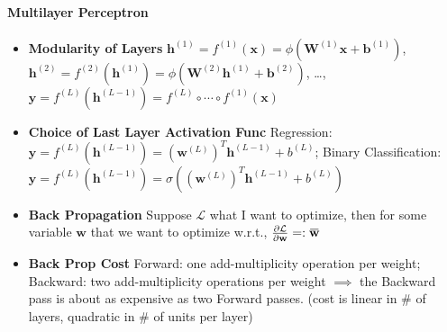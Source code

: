 \documentclass[10pt]{article}
\newcommand{\overbar}[1]{\mkern 1.5mu\overline{\mkern-1.5mu#1\mkern-1.5mu}\mkern 1.5mu}
\newcommand{\bw}{\mathbf{w}}
\begin{document}
\paragraph{Multilayer Perceptron} 
\begin{itemize}
    \setlength\itemsep{-0.45em}
    \item \textbf{Modularity of Layers} $\mathbf{h}^{(1)}=f^{(1)}(\mathbf{x})=\phi\left(\mathbf{W}^{(1)} \mathbf{x}+\mathbf{b}^{(1)}\right)$, $\mathbf{h}^{(2)}=f^{(2)}\left(\mathbf{h}^{(1)}\right)=\phi\left(\mathbf{W}^{(2)} \mathbf{h}^{(1)}+\mathbf{b}^{(2)}\right)$, \dots, $\mathbf{y}=f^{(L)}\left(\mathbf{h}^{(L-1)}\right) = f^{(L)} \circ \cdots \circ f^{(1)}(\mathbf{x})$
    \item \textbf{Choice of Last Layer Activation Func} Regression: $\mathbf{y}=f^{(L)}\left(\mathbf{h}^{(L-1)}\right)=\left(\mathbf{w}^{(L)}\right)^{T} \mathbf{h}^{(L-1)}+b^{(L)}$; Binary Classification: $\mathbf{y}=f^{(L)}\left(\mathbf{h}^{(L-1)}\right)=\sigma\left(\left(\mathbf{w}^{(L)}\right)^{T} \mathbf{h}^{(L-1)}+b^{(L)}\right)$
    \item \textbf{Back Propagation} Suppose $\mathcal{L}$ what I want to optimize, then for some variable $\bw$ that we want to optimize w.r.t., $\frac{\partial \mathcal{L}}{\partial \bw} =: \overbar{\bw}$
    \item \textbf{Back Prop Cost} Forward: one add-multiplicity operation per weight; Backward: two add-multiplicity operations per weight $\implies$ the Backward pass is about as expensive as two Forward passes. (cost is linear in \# of layers, quadratic in \# of units per layer)

\end{itemize}
\end{document}
